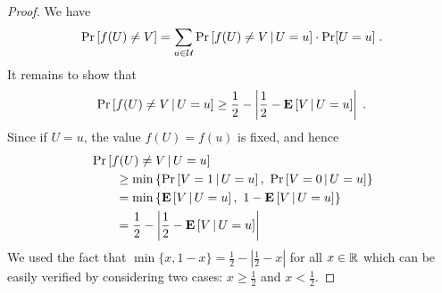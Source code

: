 \begin{proof}
We have
$$
\Pr \left[ f(U) \neq V \right] = \sum_{u \in \mathcal{U}} \Pr \left[ f(U) \neq V \, \middle| \, U = u \right] \cdot \Pr[U = u] \; .
$$
It remains to show that
$$
\Pr\left[ f(U) \neq V \, \middle| \, U = u \right]
\ge
\frac{1}{2} - \left| \frac{1}{2} -  \operatorname{\mathbf{E}} \left[V \, \middle| \, U = u \right] \right| \; .
$$
Since if  $U=u$, the value $f(U) = f(u)$ is fixed, and hence
\begin{align*}
& \Pr\left[ f(U) \neq V \, \middle| \, U = u \right] \\
& \qquad \ge \min\left\{ \Pr \left[ V = 1 \, \middle| \, U = u \right], \ \Pr \left[ V = 0 \, \middle| \, U = u \right] \right\} \\
& \qquad = \min\left\{ \operatorname{\mathbf{E}} \left[ V  \, \middle| \, U = u \right], \ 1 - \operatorname{\mathbf{E}} \left[ V \, \middle| \, U = u \right] \right\} \\
& \qquad = \frac{1}{2} - \left| \frac{1}{2} -  \operatorname{\mathbf{E}} \left[ V  \, \middle| \, U = u \right] \right|
\end{align*}
We used the fact that $\min\{x, 1 - x\} = \frac{1}{2} - \left| \frac{1}{2} - x \right|$ for all $x \in \mathbb{R}$
which can be easily verified by considering two cases: $x \ge \frac{1}{2}$ and $x < \frac{1}{2}$.
\end{proof}
